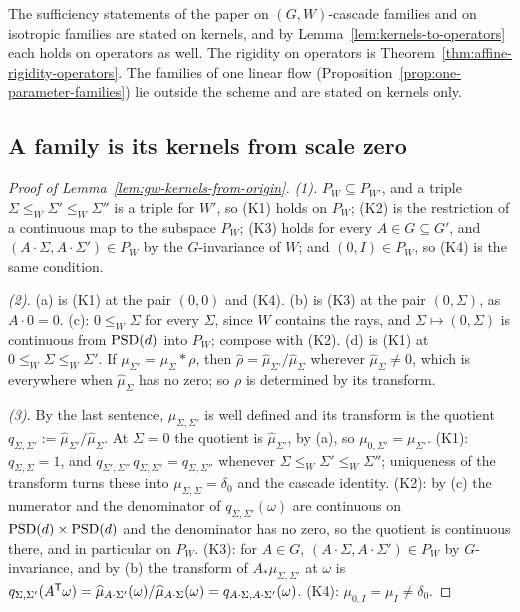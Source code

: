 The sufficiency statements of the paper on $(G, W)$-cascade families and on isotropic families are
stated on kernels, and by Lemma~\ref{lem:kernels-to-operators} each holds on operators as well. The
rigidity on operators is Theorem~\ref{thm:affine-rigidity-operators}. The families of one linear flow
(Proposition~\ref{prop:one-parameter-families}) lie outside the scheme and are stated on kernels only.

\subsection{A family is its kernels from scale zero}\label{app:classical-kernels}

\begin{proof}[Proof of Lemma~\ref{lem:gw-kernels-from-origin}]
\emph{(1).} $P_W \subseteq P_{W'}$, and a triple $\Sigma \le_W \Sigma' \le_W \Sigma''$ is a triple for
$W'$, so (K1) holds on $P_W$; (K2) is the restriction of a continuous map to the subspace $P_W$; (K3)
holds for every $A \in G \subseteq G'$, and $(A\cdot\Sigma, A\cdot\Sigma') \in P_W$ by the
$G$-invariance of $W$; and $(0, I) \in P_W$, so (K4) is the same condition.

\emph{(2).} (a) is (K1) at the pair $(0,0)$ and (K4). (b) is (K3) at the pair $(0, \Sigma)$, as
$A\cdot 0 = 0$. (c): $0 \le_W \Sigma$ for every $\Sigma$, since $W$ contains the rays, and
$\Sigma \mapsto (0, \Sigma)$ is continuous from $\mathrm{PSD}(d)$ into $P_W$; compose with (K2). (d) is (K1) at
$0 \le_W \Sigma \le_W \Sigma'$. If $\mu_{\Sigma'} = \mu_\Sigma * \rho$, then
$\widehat\rho = \widehat\mu_{\Sigma'}/\widehat\mu_\Sigma$ wherever $\widehat\mu_\Sigma \ne 0$, which is
everywhere when $\widehat\mu_\Sigma$ has no zero; so $\rho$ is determined by its transform.

\emph{(3).} By the last sentence, $\mu_{\Sigma,\Sigma'}$ is well defined and its transform is the
quotient $q_{\Sigma,\Sigma'} := \widehat\mu_{\Sigma'}/\widehat\mu_\Sigma$. At $\Sigma = 0$ the quotient is
$\widehat\mu_{\Sigma'}$, by (a), so $\mu_{0,\Sigma'} = \mu_{\Sigma'}$. (K1): $q_{\Sigma,\Sigma} = 1$, and
$q_{\Sigma',\Sigma''}\,q_{\Sigma,\Sigma'} = q_{\Sigma,\Sigma''}$ whenever $\Sigma \le_W \Sigma' \le_W \Sigma''$;
uniqueness of the transform turns these into $\mu_{\Sigma,\Sigma} = \delta_0$ and the cascade identity.
(K2): by (c) the numerator and the denominator of $q_{\Sigma,\Sigma'}(\omega)$ are continuous on
$\mathrm{PSD}(d) \times \mathrm{PSD}(d)$ and the denominator has no zero, so the quotient is continuous there, and in
particular on $P_W$. (K3): for $A \in G$, $(A\cdot\Sigma, A\cdot\Sigma') \in P_W$ by $G$-invariance, and by
(b) the transform of $A_*\mu_{\Sigma,\Sigma'}$ at $\omega$ is
$q_{\Sigma,\Sigma'}(A^{\mathsf{T}}\omega) = \widehat\mu_{A\cdot\Sigma'}(\omega)/\widehat\mu_{A\cdot\Sigma}(\omega)
= q_{A\cdot\Sigma,A\cdot\Sigma'}(\omega)$. (K4): $\mu_{0,I} = \mu_I \ne \delta_0$.
\end{proof}



